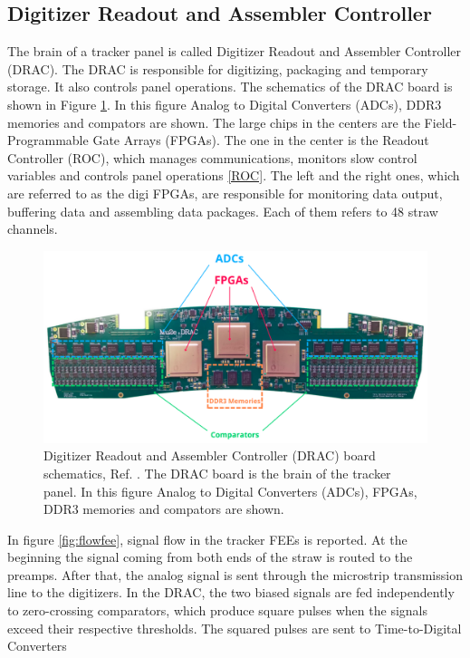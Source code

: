 \subsection{Digitizer Readout and Assembler Controller}\label{DRAC}
The brain of a tracker panel is called Digitizer Readout and Assembler Controller (DRAC). 
The DRAC is responsible for digitizing, packaging and temporary storage. It also controls 
panel operations. The schematics of the DRAC board is shown in Figure \ref{fig:drac}. In 
this figure Analog to Digital Converters (ADCs), DDR3 memories and compators are shown. 
The large chips in the centers are the Field-Programmable Gate Arrays (FPGAs). The one 
in the center is the Readout Controller (ROC), which manages communications, monitors 
slow control variables and controls panel operations \ref{ROC}. The left and the right 
ones, which are referred to as the digi FPGAs, are responsible for monitoring data output, 
buffering data and assembling data packages. Each of them refers to 48 straw channels. 
\begin{figure}[!h]
\centering
\includegraphics[width =\textwidth]{figures/png/Screenshot_20240204_115052.png}
\caption{Digitizer Readout and Assembler Controller (DRAC) board schematics, Ref. \cite{drac}. 
The DRAC board is the brain of the tracker panel. In this figure Analog to Digital Converters (ADCs), FPGAs, DDR3 memories and compators are shown.}
\label{fig:drac}
\end{figure}
In figure \ref{fig:flowfee}, signal flow in the tracker FEEs is reported. At the 
beginning the signal coming from both ends of the straw is routed to the preamps. 
After that, the analog signal is sent through the microstrip transmission line to 
the digitizers. In the DRAC, the two biased signals are fed independently to 
zero-crossing comparators, which produce square pulses when the signals exceed 
their respective thresholds. The squared pulses are sent to Time-to-Digital Converters 

